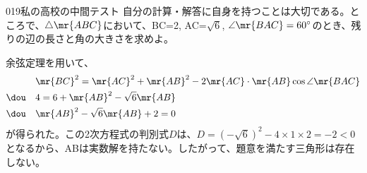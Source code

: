 \begin{prob}{019}{}{私の高校の中間テスト}
 自分の計算・解答に自身を持つことは大切である。ところで、$\triangle\mr{ABC}$において、BC=2, AC=$\sqrt{6}$, $\angle\mr{BAC}=60^\circ$のとき、残りの辺の長さと角の大きさを求めよ。
\end{prob}
余弦定理を用いて、
\begin{align*}
 &\mr{BC}^2=\mr{AC}^2+\mr{AB}^2-2\mr{AC}\cdot \mr{AB}\cos\angle\mr{BAC} \\
 \dou \quad &4=6+\mr{AB}^2-\sqrt{6}\mr{AB} \\
 \dou \quad &\mr{AB}^2-\sqrt{6}\mr{AB}+2=0
\end{align*}
が得られた。この2次方程式の判別式$D$は、$D=(-\sqrt{6})^2-4\times1\times2=-2<0$となるから、ABは実数解を持たない。したがって、題意を満たす三角形は存在しない。
